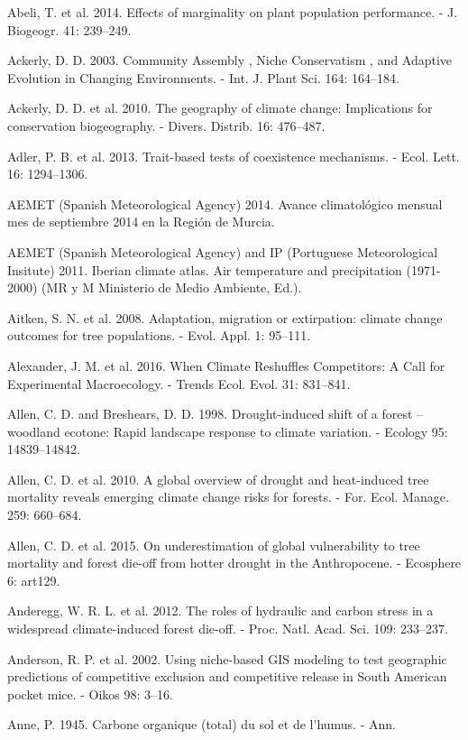 \documentclass[11pt,twoside]{reedthesis}
\begin{document}
Abeli, T. et al. 2014. Effects of marginality on plant population
performance. - J. Biogeogr. 41: 239--249.\par
Ackerly, D. D. 2003. Community Assembly , Niche Conservatism , and
Adaptive Evolution in Changing Environments. - Int. J. Plant Sci. 164:
164--184.\par
Ackerly, D. D. et al. 2010. The geography of climate change:
Implications for conservation biogeography. - Divers. Distrib. 16:
476--487.\par
Adler, P. B. et al. 2013. Trait-based tests of coexistence mechanisms. -
Ecol. Lett. 16: 1294--1306.\par
AEMET (Spanish Meteorological Agency) 2014. Avance climatológico mensual
mes de septiembre 2014 en la Región de Murcia.\par
AEMET (Spanish Meteorological Agency) and IP (Portuguese Meteorological
Insitute) 2011. Iberian climate atlas. Air temperature and precipitation
(1971-2000) (MR y M Ministerio de Medio Ambiente, Ed.).\par
Aitken, S. N. et al. 2008. Adaptation, migration or extirpation: climate
change outcomes for tree populations. - Evol. Appl. 1: 95--111.\par
Alexander, J. M. et al. 2016. When Climate Reshuffles Competitors: A
Call for Experimental Macroecology. - Trends Ecol. Evol. 31:
831--841.\par
Allen, C. D. and Breshears, D. D. 1998. Drought-induced shift of a
forest -- woodland ecotone: Rapid landscape response to climate
variation. - Ecology 95: 14839--14842.\par
Allen, C. D. et al. 2010. A global overview of drought and heat-induced
tree mortality reveals emerging climate change risks for forests. - For.
Ecol. Manage. 259: 660--684.\par
Allen, C. D. et al. 2015. On underestimation of global vulnerability to
tree mortality and forest die-off from hotter drought in the
Anthropocene. - Ecosphere 6: art129.\par
Anderegg, W. R. L. et al. 2012. The roles of hydraulic and carbon stress
in a widespread climate-induced forest die-off. - Proc. Natl. Acad. Sci.
109: 233--237.\par
Anderson, R. P. et al. 2002. Using niche-based GIS modeling to test
geographic predictions of competitive exclusion and competitive release
in South American pocket mice. - Oikos 98: 3--16.\par
Anne, P. 1945. Carbone organique (total) du sol et de l'humus. - Ann.
\end{document}
